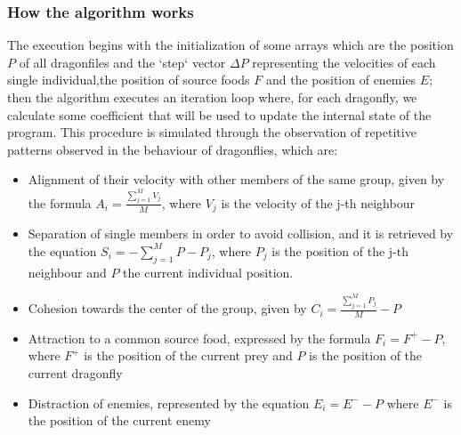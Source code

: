 \documentclass[10pt]{article}
\begin{document}
\begin{multicols}{2}
\subsubsection*{How the algorithm works}
The execution begins with the initialization of some arrays which are the position $P$ of all dragonfiles and the `step` vector $\Delta P$ representing the velocities of each single individual,the position of source foods $F$ and the position of enemies $E$; then the algorithm executes an iteration loop where, for each dragonfly, we calculate some coefficient that will be used to update the internal state of the program. This procedure is simulated through the observation of repetitive patterns observed in the behaviour of dragonflies, which are:



\begin{itemize}
  \item Alignment of their velocity with other members of the same group, given by the formula  $A_i = \frac{\sum^M_{j=1}V_j}{M}$, where $V_j$ is the velocity of the j-th neighbour

  \item Separation of single members in order to avoid collision, and it is retrieved by the equation  $S_i = - \sum^M_{j=1}{P - P_j}$, where $P_j$ is the position of the j-th neighbour and $P$ the current individual position.
    
  \item Cohesion towards the center of the group, given by $C_i = \frac{\sum^M_{j=1}P_j}{M} - P$ 
  \item Attraction to a common source food, expressed by the formula $ F_i = F^+ - P$, where $F^+$ is the position of the current prey and $P$ is the position of the current dragonfly
  \item Distraction of enemies, represented by the equation $ E_i = E^- - P$ where $E^-$ is the position of the current enemy 
\end{itemize}


\end{multicols}
\end{document}
